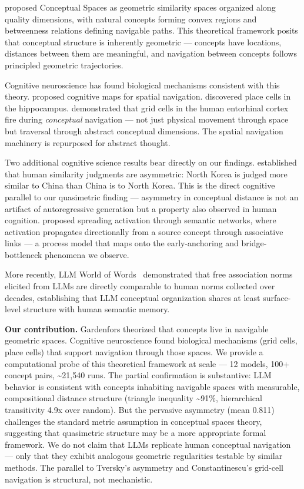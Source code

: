 \citet{gardenfors2000} proposed Conceptual Spaces as geometric similarity spaces organized along quality dimensions, with natural concepts forming convex regions and betweenness relations defining navigable paths. This theoretical framework posits that conceptual structure is inherently geometric --- concepts have locations, distances between them are meaningful, and navigation between concepts follows principled geometric trajectories.

Cognitive neuroscience has found biological mechanisms consistent with this theory. \citet{tolman1948cognitive} proposed cognitive maps for spatial navigation. \citet{okeefe1971hippocampus} discovered place cells in the hippocampus. \citet{constantinescu2016grid} demonstrated that grid cells in the human entorhinal cortex fire during \emph{conceptual} navigation --- not just physical movement through space but traversal through abstract conceptual dimensions. The spatial navigation machinery is repurposed for abstract thought.

Two additional cognitive science results bear directly on our findings. \citet{tversky1977features} established that human similarity judgments are asymmetric: North Korea is judged more similar to China than China is to North Korea. This is the direct cognitive parallel to our quasimetric finding --- asymmetry in conceptual distance is not an artifact of autoregressive generation but a property also observed in human cognition. \citet{collins1975spreading} proposed spreading activation through semantic networks, where activation propagates directionally from a source concept through associative links --- a process model that maps onto the early-anchoring and bridge-bottleneck phenomena we observe.

More recently, LLM World of Words~\citep{llmwow2025} demonstrated that free association norms elicited from LLMs are directly comparable to human norms collected over decades, establishing that LLM conceptual organization shares at least surface-level structure with human semantic memory.

\textbf{Our contribution.} Gardenfors theorized that concepts live in navigable geometric spaces. Cognitive neuroscience found biological mechanisms (grid cells, place cells) that support navigation through those spaces. We provide a computational probe of this theoretical framework at scale --- 12 models, 100+ concept pairs, \textasciitilde21,540 runs. The partial confirmation is substantive: LLM behavior is consistent with concepts inhabiting navigable spaces with measurable, compositional distance structure (triangle inequality \textasciitilde91\%, hierarchical transitivity 4.9x over random). But the pervasive asymmetry (mean 0.811) challenges the standard metric assumption in conceptual spaces theory, suggesting that quasimetric structure may be a more appropriate formal framework. We do not claim that LLMs replicate human conceptual navigation --- only that they exhibit analogous geometric regularities testable by similar methods. The parallel to Tversky's asymmetry and Constantinescu's grid-cell navigation is structural, not mechanistic.

